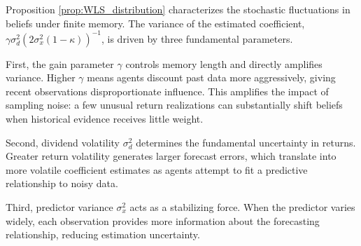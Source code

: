 Proposition \ref{prop:WLS_distribution} characterizes the stochastic fluctuations in beliefs under finite memory. 
The variance of the estimated coefficient, $\gamma \sigma_d^2 (2\sigma^2_x(1-\kappa))^{-1}$, is driven by three fundamental parameters.

First, the gain parameter $\gamma$ controls memory length and directly amplifies variance. Higher $\gamma$ means agents discount past data more aggressively, giving recent observations disproportionate influence. This amplifies the impact of sampling noise: a few unusual return realizations can substantially shift beliefs when historical evidence receives little weight. 

Second, dividend volatility $\sigma_d^2$ determines the fundamental uncertainty in returns. Greater return volatility generates larger forecast errors, which translate into more volatile coefficient estimates as agents attempt to fit a predictive relationship to noisy data.

Third, predictor variance $\sigma^2_x$ acts as a stabilizing force. When the predictor varies widely, each observation provides more information about the forecasting relationship, reducing estimation uncertainty. 
